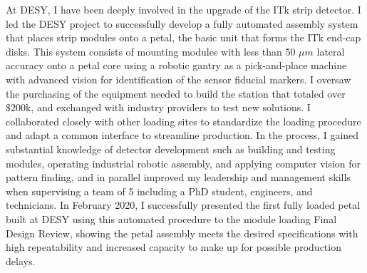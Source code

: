 \documentclass[a4paper]{article}
\begin{document}
At DESY, I have been deeply involved in the upgrade of the ITk strip detector\cite{ITKstrips}.
I led the DESY project to successfully develop a fully automated assembly system that places strip modules onto a petal, the basic unit that forms the ITk end-cap disks.
This system consists of mounting modules with less than 50 $\mu m$ lateral accuracy onto a petal core using a robotic gantry as a pick-and-place machine with advanced vision for identification of the sensor fiducial markers. I oversaw the purchasing of the equipment needed to build the station that totaled over $\$200$k, and exchanged with industry providers to test new solutions. I collaborated closely with other loading sites to standardize the loading procedure and adapt a common interface to streamline production.
In the process, I gained substantial knowledge of detector development such as building and testing modules, operating industrial robotic assembly, and applying computer vision for pattern finding, and in parallel improved my leadership and management skills when supervising a team of 5 including a PhD student, engineers, and technicians. In February 2020, I successfully presented the first fully loaded petal built at DESY using this automated procedure to the module loading Final Design Review, showing the petal assembly meets the desired specifications with high repeatability and increased capacity to make up for possible production delays.


\end{document}
